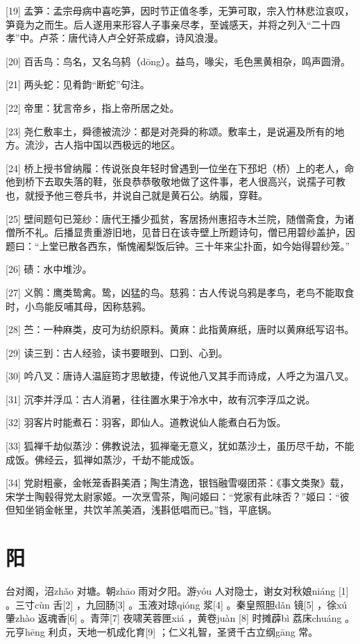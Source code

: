 \documentclass[12pt,UTF8]{ctexbook}
\begin{document}
[19] 孟笋：孟宗母病中喜吃笋，因时节正值冬季，无笋可取，宗入竹林悲泣哀叹，笋竟为之而生。后人遂用来形容人子事亲尽孝，至诚感天，并将之列入“二十四孝”中。卢茶：唐代诗人卢仝好茶成癖，诗风浪漫。

[20] 百舌鸟：鸟名，又名乌鸫（dōng）。益鸟，喙尖，毛色黑黄相杂，鸣声圆滑。

[21] 两头蛇：见肴韵“断蛇”句注。

[22] 帝里：犹言帝乡，指上帝所居之处。

[23] 尧仁敷率土，舜德被流沙：都是对尧舜的称颂。敷率土，是说遍及所有的地方。流沙，古人指中国以西极远的地区。

[24] 桥上授书曾纳履：传说张良年轻时曾遇到一位坐在下邳圯（桥）上的老人，命他到桥下去取失落的鞋，张良恭恭敬敬地做了这件事，老人很高兴，说孺子可教也，就授予他三卷兵书，并说自己就是黄石公。纳履，穿鞋。

[25] 壁间题句已笼纱：唐代王播少孤贫，客居扬州惠招寺木兰院，随僧斋食，为诸僧所不礼。后播显贵重游旧地，见昔日在该寺壁上所题诗句，僧已用碧纱盖护，因题曰：“上堂已散各西东，惭愧阇梨饭后钟。三十年来尘扑面，如今始得碧纱笼。”

[26] 碛：水中堆沙。

[27] 义鹘：鹰类鸷禽。鸷，凶猛的鸟。慈鸦：古人传说乌鸦是孝鸟，老鸟不能取食时，小鸟能反哺其母，因称慈鸦。

[28] 苎：一种麻类，皮可为纺织原料。黄麻：此指黄麻纸，唐时以黄麻纸写诏书。

[29] 读三到：古人经验，读书要眼到、口到、心到。

[30] 吟八叉：唐诗人温庭筠才思敏捷，传说他八叉其手而诗成，人呼之为温八叉。

[31] 沉李并浮瓜：古人消暑，往往置水果于冷水中，故有沉李浮瓜之说。

[32] 羽客片时能煮石：羽客，即仙人。道教说仙人能煮白石为饭。

[33] 狐禅千劫似蒸沙：佛教说法，狐禅毫无意义，犹如蒸沙土，虽历尽千劫，不能成饭。佛经云，狐禅如蒸沙，千劫不能成饭。

[34] 党尉粗豪，金帐笼香斟美酒；陶生清逸，银铛融雪啜团茶：《事文类聚》载，宋学士陶毂得党太尉家姬。一次烹雪茶，陶问姬曰：“党家有此味否？”姬曰：“彼但知坐销金帐里，共饮羊羔美酒，浅斟低唱而已。”铛，平底锅。





\chapter{阳}


台对阁，沼zhǎo 对塘。朝zhāo 雨对夕阳。游yóu 人对隐士，谢女对秋娘niáng [1] 。三寸cùn 舌[2] ，九回肠[3] 。玉液对琼qióng 浆[4] 。秦皇照胆dǎn 镜[5] ，徐xú 肇zhào 返魂香[6] 。青萍[7] 夜啸芙蓉匣xiá ，黄卷juàn [8] 时摊薜bì 荔床chuáng 。元亨hēng 利贞，天地一机成化育[9] ；仁义礼智，圣贤千古立纲gāng 常。
\end{document}
